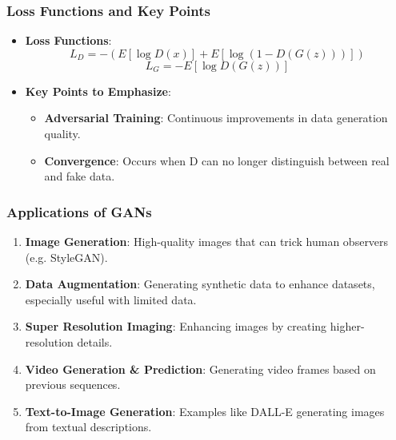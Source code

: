 \documentclass[aspectratio=169]{beamer}
\begin{document}
\begin{frame}[fragile]
    \frametitle{Loss Functions and Key Points}
    \begin{itemize}
        \item \textbf{Loss Functions}:
        \begin{equation}
            L_D = - (E[\log D(x)] + E[\log(1 - D(G(z)))] )
        \end{equation}
        \begin{equation}
            L_G = - E[\log D(G(z))]
        \end{equation}
        
        \item \textbf{Key Points to Emphasize}:
        \begin{itemize}
            \item \textbf{Adversarial Training}: Continuous improvements in data generation quality.
            \item \textbf{Convergence}: Occurs when D can no longer distinguish between real and fake data.
        \end{itemize}
    \end{itemize}
\end{frame}

\begin{frame}[fragile]
    \frametitle{Applications of GANs}
    \begin{enumerate}
        \item \textbf{Image Generation}: High-quality images that can trick human observers (e.g. StyleGAN).
        \item \textbf{Data Augmentation}: Generating synthetic data to enhance datasets, especially useful with limited data.
        \item \textbf{Super Resolution Imaging}: Enhancing images by creating higher-resolution details.
        \item \textbf{Video Generation \& Prediction}: Generating video frames based on previous sequences.
        \item \textbf{Text-to-Image Generation}: Examples like DALL-E generating images from textual descriptions.
    \end{enumerate}
\end{frame}
\end{document}
